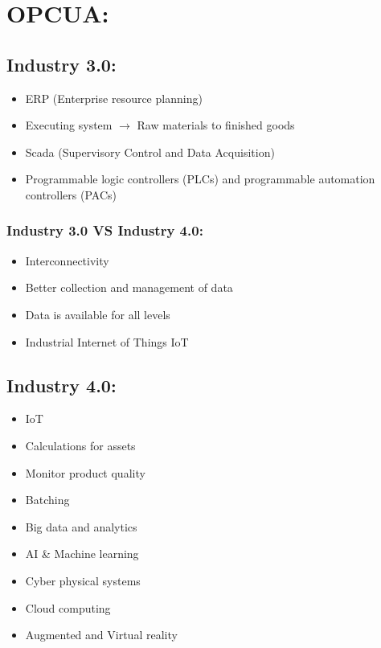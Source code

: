 \documentclass[12pt]{article}
\begin{document}
\section{OPCUA:}
\subsection{Industry 3.0:}
\begin{itemize}
    \item ERP (Enterprise resource planning)
    \item Executing system $\rightarrow$ Raw materials to finished goods
    \item Scada (Supervisory Control and Data Acquisition)
    \item Programmable logic controllers (PLCs) and programmable automation controllers (PACs)
\end{itemize}
\subsubsection{Industry 3.0 VS Industry 4.0:}\begin{itemize}
    \item Interconnectivity
    \item Better collection and management of data 
    \item Data is available for all levels 
    \item Industrial Internet of Things IoT
\end{itemize}
\subsection{Industry 4.0:}
\begin{itemize}
    \item IoT 
    \item Calculations for assets 
    \item Monitor product quality 
    \item Batching 
    \item Big data and analytics 
    \item AI \& Machine learning
    \item Cyber physical systems 
    \item Cloud computing 
    \item Augmented and Virtual reality
\end{itemize}
\end{document}

